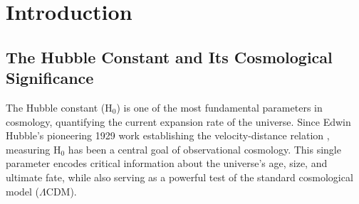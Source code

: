 \documentclass[preprint, linenumbers]{aastex701}
\begin{document}
\begin{abstract}
We find Cepheid systematics underestimated: SH0ES $\sigma_{\rm sys} = 1.04$ vs. our $\sigma_{\rm sys,corr} = 1.71$ km~s$^{-1}$~Mpc$^{-1}$ (1.6$\times$ factor after removing unsupported covariant crowding term and adopting metallicity consensus baseline $\gamma=-0.2\pm0.1$). Correlations increase uncertainty by 18\% vs. independence assumption. Key sources: period distribution (explicit bracket $[-1.5, -3.5]$ km~s$^{-1}$~Mpc$^{-1}$, adopted mid-range $-2.5$), metallicity ($\gamma$-dependent), and parallax (scenario-dependent). With realistic systematics and evidence-based corrections (Scenario A + Prior 1 baseline), tension reduces from 5.9$\sigma$ to 1.1$\sigma$ \textit{relative to Planck's $\Lambda$CDM-inferred H$_0$}. Independently of Planck, late-universe methods---JAGB stars and cosmic chronometers---converge at H$_0 = 68.22 \pm 1.36$ km~s$^{-1}$~Mpc$^{-1}$ ($\chi^2_{\rm red} \approx 0.02$), and our corrected Cepheid value (69.54 $\pm$ 1.89 km~s$^{-1}$~Mpc$^{-1}$) lies $\sim$0.6$\sigma$ from this mean. The tension is consistent with being predominantly a consequence of underestimated measurement uncertainties, with the residual ($\sim$1--2$\sigma$) consistent with ordinary measurement challenges rather than new physics, redirecting focus from exotic models toward systematic error reduction.

\end{abstract}



\section{Introduction} \label{sec:intro}

\subsection{The Hubble Constant and Its Cosmological Significance}

The Hubble constant (H$_0$) is one of the most fundamental parameters in cosmology, quantifying the current expansion rate of the universe. Since Edwin Hubble's pioneering 1929 work establishing the velocity-distance relation \citep{Hubble1929}, measuring H$_0$ has been a central goal of observational cosmology. This single parameter encodes critical information about the universe's age, size, and ultimate fate, while also serving as a powerful test of the standard cosmological model ($\Lambda$CDM).
\end{document}
